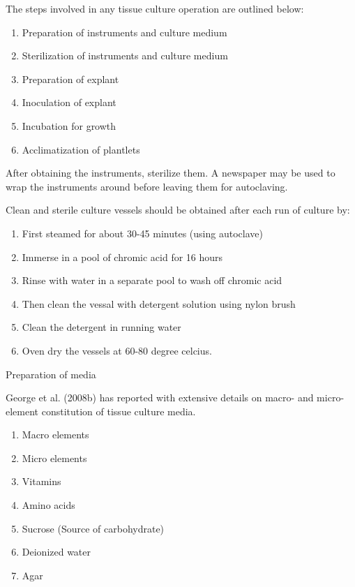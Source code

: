 \documentclass[
  man]{apa6}
\providecommand{\tightlist}{%
  \setlength{\itemsep}{0pt}\setlength{\parskip}{0pt}}
\begin{document}
The steps involved in any tissue culture operation are outlined below:

\begin{enumerate}
\def\labelenumi{\arabic{enumi}.}
\tightlist
\item
  Preparation of instruments and culture medium
\item
  Sterilization of instruments and culture medium
\item
  Preparation of explant
\item
  Inoculation of explant
\item
  Incubation for growth
\item
  Acclimatization of plantlets
\end{enumerate}

After obtaining the instruments, sterilize them. A newspaper may be used to wrap the instruments around before leaving them for autoclaving.

Clean and sterile culture vessels should be obtained after each run of culture by:

\begin{enumerate}
\def\labelenumi{\arabic{enumi}.}
\tightlist
\item
  First steamed for about 30-45 minutes (using autoclave)
\item
  Immerse in a pool of chromic acid for 16 hours
\item
  Rinse with water in a separate pool to wash off chromic acid
\item
  Then clean the vessal with detergent solution using nylon brush
\item
  Clean the detergent in running water
\item
  Oven dry the vessels at 60-80 degree celcius.
\end{enumerate}

Preparation of media

George et al. (2008b) has reported with extensive details on macro- and micro- element constitution of tissue culture media.

\begin{enumerate}
\def\labelenumi{\arabic{enumi}.}
\tightlist
\item
  Macro elements
\item
  Micro elements
\item
  Vitamins
\item
  Amino acids
\item
  Sucrose (Source of carbohydrate)
\item
  Deionized water
\item
  Agar
\end{enumerate}
\end{document}
